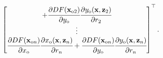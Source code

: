 \begin{align}
\begin{bmatrix}
        + \cfrac{\partial DF(\mathbf{x}_{\text{o}2})}{\partial y_{\text{o}}}\cfrac{\partial y_{\text{o}}(\mathbf{x},\mathbf{z}_2)}{\partial r_2} \\
        \vdots                                                                                                                                   \\
        \cfrac{\partial DF(\mathbf{x}_{\text{o}n})}{\partial x_{\text{o}}}\cfrac{\partial x_{\text{o}}(\mathbf{x},\mathbf{z}_n)}{\partial r_n}
        + \cfrac{\partial DF(\mathbf{x}_{\text{o}n})}{\partial y_{\text{o}}}\cfrac{\partial y_{\text{o}}(\mathbf{x},\mathbf{z}_n)}{\partial r_n} \\
    \end{bmatrix}^{\top}.
\end{align}